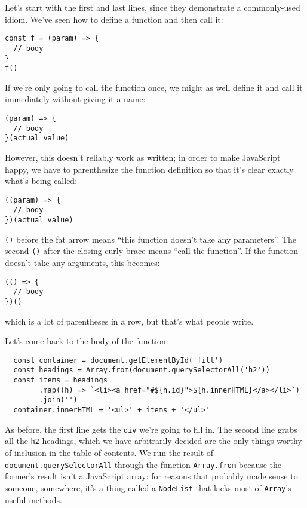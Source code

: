Let's start with the first and last lines,
since they demonstrate a commonly-used idiom.
We've seen how to define a function and then call it:

\begin{verbatim}
const f = (param) => {
  // body
}
f()
\end{verbatim}

If we're only going to call the function once,
we might as well define it and call it immediately without giving it a name:

\begin{verbatim}
(param) => {
  // body
}(actual_value)
\end{verbatim}

However,
this doesn't reliably work as written;
in order to make JavaScript happy,
we have to parenthesize the function definition
so that it's clear exactly what's being called:

\begin{verbatim}
((param) => {
  // body
})(actual_value)
\end{verbatim}

\texttt{()} before the fat arrow means ``this function doesn't take any parameters''.
The second \texttt{()} after the closing curly brace means ``call the function''.
If the function doesn't take any arguments,
this becomes:

\begin{verbatim}
(() => {
  // body
})()
\end{verbatim}

\noindent
which is a lot of parentheses in a row,
but that's what people write.

Let's come back to the body of the function:

\begin{verbatim}
  const container = document.getElementById('fill')
  const headings = Array.from(document.querySelectorAll('h2'))
  const items = headings
        .map((h) => `<li><a href="#${h.id}">${h.innerHTML}</a></li>`)
        .join('')
  container.innerHTML = '<ul>' + items + '</ul>'
\end{verbatim}

As before,
the first line gets the \texttt{div} we're going to fill in.
The second line grabs all the \texttt{h2} headings,
which we have arbitrarily decided are the only things worthy of inclusion
in the table of contents.
We run the result of \texttt{document.querySelectorAll}
through the function \texttt{Array.from}
because the former's result isn't a JavaScript array:
for reasons that probably made sense to someone, somewhere,
it's a thing called a \texttt{NodeList}
that lacks most of \texttt{Array}'s useful methods.


